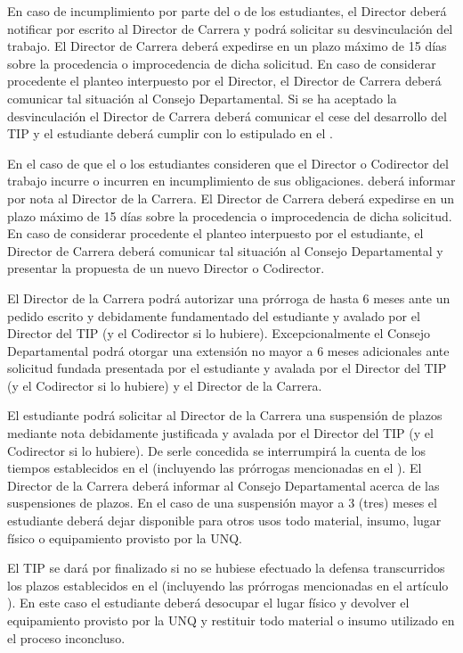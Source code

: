 
\articulo En caso de incumplimiento por parte del o de los estudiantes, el
Director deberá notificar por escrito al Director de Carrera y podrá solicitar su
desvinculación del trabajo. El Director de Carrera deberá expedirse en un plazo
máximo de 15 días sobre la procedencia o improcedencia de dicha solicitud. En caso
de considerar procedente el planteo interpuesto por el Director, el Director de Carrera
deberá comunicar tal situación al Consejo Departamental. Si se ha aceptado la
desvinculación el Director de Carrera deberá comunicar el cese del desarrollo del TIP
y el estudiante deberá cumplir con lo estipulado en el \artFinalizado.

\articulo En el caso de que el o los estudiantes consideren que el Director
o Codirector del trabajo incurre o incurren en incumplimiento de sus obligaciones.
deberá informar por nota al Director de la Carrera. El Director de Carrera deberá
expedirse en un plazo máximo de 15 días sobre la procedencia o improcedencia de
dicha solicitud. En caso de considerar procedente el planteo interpuesto por el
estudiante, el Director de Carrera deberá comunicar tal situación al Consejo
Departamental y presentar la propuesta de un nuevo Director o Codirector. 

\articulo {} El Director de la Carrera podrá autorizar una
prórroga de hasta 6 meses ante un pedido escrito y debidamente fundamentado del estudiante y avalado
por el Director del TIP (y el Codirector si lo hubiere). Excepcionalmente el Consejo
Departamental podrá otorgar una extensión no mayor a 6 meses adicionales ante
solicitud fundada presentada por el estudiante y avalada por el Director del TIP (y el
Codirector si lo hubiere) y el Director de la Carrera. 

\articulo El estudiante podrá solicitar al Director de la Carrera una
suspensión de plazos mediante nota debidamente justificada y avalada por el Director
del TIP (y el Codirector si lo hubiere). De serle concedida se interrumpirá la cuenta de
los tiempos establecidos en el \artTiempo (incluyendo las prórrogas mencionadas
en el \artProrrogas). El Director de la Carrera deberá informar al Consejo
Departamental acerca de las suspensiones de plazos. En el caso de una suspensión mayor a 3 (tres)
meses el estudiante deberá dejar disponible para otros usos todo material, insumo,
lugar físico o equipamiento provisto por la UNQ.

\articulo {} El TIP se dará por finalizado si no se hubiese
efectuado la defensa transcurridos los plazos establecidos en el \artTiempo
(incluyendo las prórrogas mencionadas en el artículo \artProrrogas). En este
caso el estudiante deberá desocupar el lugar físico y devolver el equipamiento provisto por la UNQ y restituir todo material o insumo
utilizado en el proceso inconcluso.

